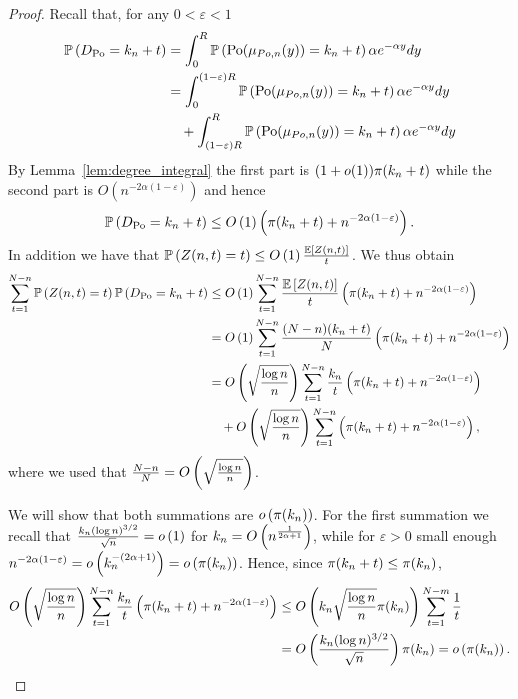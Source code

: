 \begin{proof}
Recall that, for any $0 < \varepsilon < 1$
\begin{align*}
	\mathbb{P}\left(D_{{\mathrm{Po}}} = k_n + t\right) &= \int_0^R \mathbb{P}\left({\mathrm{Po}}(\mu_{Po,n}(y)) = k_n+ t\right) \alpha e^{-\alpha y} dy\\
	&= \int_0^{(1-\varepsilon)R} \mathbb{P}\left({\mathrm{Po}}(\mu_{Po,n}(y)) = k_n+ t\right) \alpha e^{-\alpha y} dy \\
	&\hspace{10pt}+ \int_{(1-\varepsilon)R}^R \mathbb{P}\left({\mathrm{Po}}(\mu_{Po,n}(y)) = k_n+ t\right) \alpha e^{-\alpha y} dy
\end{align*}
By Lemma~\ref{lem:degree_integral} the first part is $(1+o(1)) {\pi}(k_n + t)$ while the second part is $O(n^{-2\alpha(1-\varepsilon)})$ and hence
\[
	\mathbb{P}\left(D_{{\mathrm{Po}}} = k_n + t\right) \le O\left(1\right)\left({\pi}(k_n + t) + n^{-2\alpha(1-\varepsilon)}\right).
\]
In addition we have that $\mathbb{P}\left(Z(n,t) = t\right) \le O\left(1\right) \frac{\mathbb{E}\left[Z(n,t)\right]}{t}$. We thus obtain
\begin{align*}
	\sum_{t = 1}^{N-n} \mathbb{P}\left(Z(n,t) = t\right)\mathbb{P}\left(D_{{\mathrm{Po}}} = k_n + t\right)
	&\le O\left(1\right) \sum_{t = 1}^{N-n} \frac{\mathbb{E}\left[Z(n,t)\right]}{t}\left({\pi}(k_n + t) + n^{-2\alpha(1-\varepsilon)}\right)\\
	&= O\left(1\right) \sum_{t = 1}^{N-n} \frac{(N-n)(k_n + t)}{N}\left({\pi}(k_n + t) + n^{-2\alpha(1-\varepsilon)}\right)\\
	&= O\left(\sqrt{\frac{\log n}{n}}\right) \sum_{t = 1}^{N-n} \frac{k_n}{t}
		\left({\pi}(k_n + t) + n^{-2\alpha(1-\varepsilon)}\right)\\
	&\hspace{10pt}+ O\left(\sqrt{\frac{\log n}{n}}\right) \sum_{t = 1}^{N-n}
		\left({\pi}(k_n + t) + n^{-2\alpha(1-\varepsilon)}\right),
\end{align*}
where we used that $\frac{N-n}{N} = O\left(\sqrt{\frac{\log n}{n}}\right)$.

We will show that both summations are $o\left({\pi}(k_n)\right)$. For the first summation we recall that $\frac{k_n (\log n)^{3/2}}{\sqrt{n}} = o\left(1\right)$ for $k_n = O\left(n^{\frac{1}{2\alpha + 1}}\right)$, while for $\varepsilon > 0$ small enough $n^{-2\alpha(1-\varepsilon)} = o\left(k_n^{-(2\alpha + 1)}\right) = o\left({\pi}(k_n)\right)$. Hence, since ${\pi}(k_n + t)\le {\pi}(k_n)$,
\begin{align*}
	O\left(\sqrt{\frac{\log n}{n}}\right) \sum_{t = 1}^{N-n} \frac{k_n}{t}
		\left({\pi}(k_n + t) + n^{-2\alpha(1-\varepsilon)}\right)
	&\le O\left( k_n \sqrt{\frac{\log n}{n}} {\pi}(k_n)\right) \sum_{t = 1}^{N - m} \frac{1}{t}\\
	&= O\left(\frac{k_n (\log n)^{3/2}}{\sqrt{n}}\right) {\pi}(k_n) = o\left({\pi}(k_n)\right).
\end{align*}


\end{proof}
